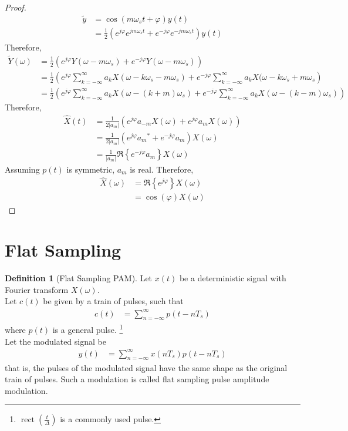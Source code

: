 \documentclass[titlepage, fleqn, a4paper, 12pt, twoside]{article}
\theoremstyle{definition}
\newtheorem{definition}{Definition}
\theoremstyle{theorem}
\renewcommand{\tilde}{\widetilde}
\renewcommand{\hat}{\widehat}
\DeclareMathOperator{\rect}{\mathrm{rect}}
\begin{document}
\begin{proof}
	\begin{align*}
		\tilde{y} &= \cos(m \omega_s t + \varphi) y(t)\\
		&= \frac{1}{2} \left( e^{j \varphi} e^{j m \omega_s t} + e^{-j \varphi} e^{-j m \omega_s t} \right) y(t)
	\end{align*}
	Therefore,
	\begin{align*}
		\tilde{Y}(\omega) &= \frac{1}{2} \left( e^{j \varphi} Y(\omega - m \omega_s) + e^{-j \varphi} Y(\omega - m \omega_s) \right)\\
		&= \frac{1}{2} \left( e^{j \varphi} \sum\limits_{k = -\infty}^{\infty} a_k X(\omega - k \omega_s - m \omega_s) + e^{-j \varphi} \sum\limits_{k = -\infty}^{\infty} a_k X(\omega - k \omega_s + m \omega_s \right)\\
		&= \frac{1}{2} \left( e^{j \varphi} \sum\limits_{k = -\infty}^{\infty} a_k X\left( \omega - (k + m) \omega_s \right) + e^{-j \varphi} \sum\limits_{k = -\infty}^{\infty} a_k X\left( \omega - (k - m) \omega_s \right) \right)
	\end{align*}
	Therefore,
	\begin{align*}
		\hat{X}(t) &= \frac{1}{2 |a_m|} \left( e^{j \varphi} a_{-m} X(\omega) + e^{j \varphi} a_m X(\omega) \right)\\
		&= \frac{1}{2 |a_m|} \left( e^{j \varphi} {a_m}^* + e^{-j \varphi} a_m \right) X(\omega)\\
		&= \frac{1}{|a_m|} \Re\left\{ e^{-j \varphi} a_m \right\} X(\omega)
	\end{align*}
	Assuming $p(t)$ is symmetric, $a_m$ is real.
	Therefore,
	\begin{align*}
		\hat{X}(\omega) &= \Re\left\{ e^{j \varphi} \right\} X(\omega)\\
		&= \cos(\varphi) X(\omega)
	\end{align*}
\end{proof}

\section{Flat Sampling}

\begin{definition}[Flat Sampling PAM]
	Let $x(t)$ be a deterministic signal with Fourier transform $X(\omega)$.\\
	Let $c(t)$ be given by a train of pulses, such that
	\begin{align*}
		c(t) &= \sum\limits_{n = -\infty}^{\infty} p(t - n T_s)
	\end{align*}
	where $p(t)$ is a general pulse.
	\footnote{$\rect\left( \frac{t}{\Delta} \right)$ is a commonly used pulse.}\\
	Let the modulated signal be
	\begin{align*}
		y(t) &= \sum\limits_{n = -\infty}^{\infty} x(n T_s) p(t - n T_s)
	\end{align*}
	that is, the pulses of the modulated signal have the same shape as the original train of pulses.
	Such a modulation is called flat sampling pulse amplitude modulation.
	\label{def:flat_sampling_PAM}
\end{definition}
\end{document}
